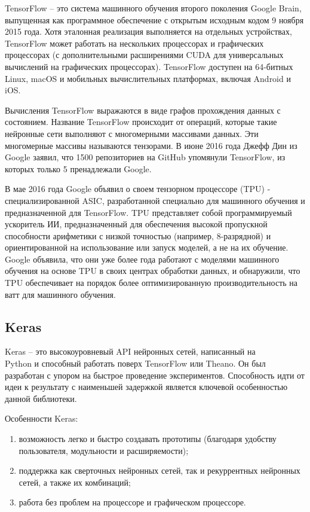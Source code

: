 TensorFlow -- это система машинного обучения второго поколения \linebreak Google Brain, выпущенная как программное обеспечение с открытым исходным кодом 9 ноября 2015 года. Хотя эталонная реализация выполняется на отдельных устройствах, TensorFlow может работать на нескольких процессорах и графических процессорах (с дополнительными расширениями CUDA для универсальных вычислений на графических процессорах). TensorFlow доступен на 64-битных Linux, macOS и мобильных вычислительных платформах, включая Android и iOS.

Вычисления TensorFlow выражаются в виде графов прохождения данных с состоянием. Название TensorFlow происходит от операций, которые такие нейронные сети выполняют с многомерными массивами данных. Эти многомерные массивы называются тензорами. В июне 2016 года Джефф Дин из Google заявил, что 1500 репозиториев на GitHub упомянули TensorFlow, из которых только 5 пренадлежали Google.

В мае 2016 года Google объявил о своем тензорном процессоре (TPU) - специализированной ASIC, разработанной специально для машинного обучения и предназначенной для TensorFlow. TPU представляет собой программируемый ускоритель ИИ, предназначенный для обеспечения высокой пропускной способности арифметики с низкой точностью (например, 8-разрядной) и ориентированной на использование или запуск моделей, а не на их обучение. Google объявила, что они уже более года работают с моделями машинного обучения на основе TPU в своих центрах обработки данных, и обнаружили, что TPU обеспечивает на порядок более оптимизированную производительность на ватт для машинного обучения.

\subsection{Keras}
\label{sec:development:keras}

Keras -- это высокоуровневый API нейронных сетей, написанный на \\Python и способный работать поверх TensorFlow или Theano. Он был разработан с упором на быстрое проведение экспериментов. Способность идти от идеи к результату с наименьшей задержкой является ключевой особенностью данной библиотеки.

Особенности Keras:
\begin{enumerate}
  \item возможность легко и быстро создавать прототипы (благодаря удобству пользователя, модульности и расширяемости);
  \item поддержка как сверточных нейронных сетей, так и рекуррентных нейронных сетей, а также их комбинаций;
  \item работа без проблем на процессоре и графическом процессоре.
\end{enumerate}

